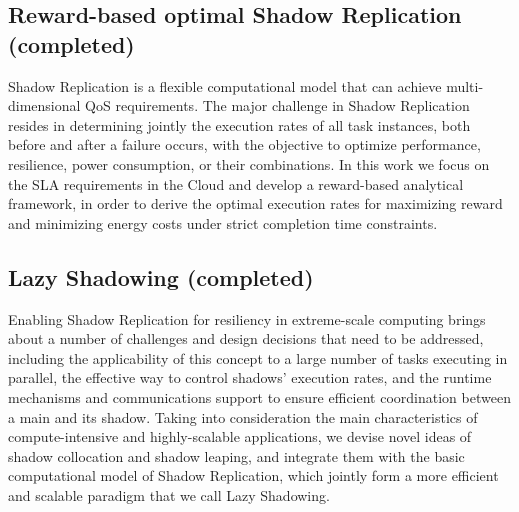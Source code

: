 
\subsection{Reward-based optimal Shadow Replication (completed)}
Shadow Replication is a flexible computational model that can achieve multi-dimensional QoS requirements. 
The major challenge in Shadow Replication resides in determining jointly the execution rates of all task instances, 
both before and after a failure occurs, with the objective to optimize performance, resilience, power consumption, or their combinations.
In this work we focus on the SLA requirements in the Cloud and develop a reward-based analytical framework, in order to derive the optimal execution rates for maximizing reward and minimizing energy 
costs under strict completion time constraints. 




\subsection{Lazy Shadowing (completed)}

Enabling Shadow Replication for resiliency in extreme-scale computing brings about a number of challenges and design decisions 
that need to be addressed, including the applicability of this concept to a large number of tasks executing in parallel, 
the effective way to control shadows’ execution rates, and the runtime mechanisms and communications support to ensure efficient 
coordination between a main and its shadow. Taking into consideration the main characteristics of compute-intensive and 
highly-scalable applications, 
we devise novel ideas of shadow collocation and shadow leaping, and integrate them with the basic computational model of Shadow Replication, which jointly form a more efficient and scalable paradigm that we call Lazy Shadowing.

